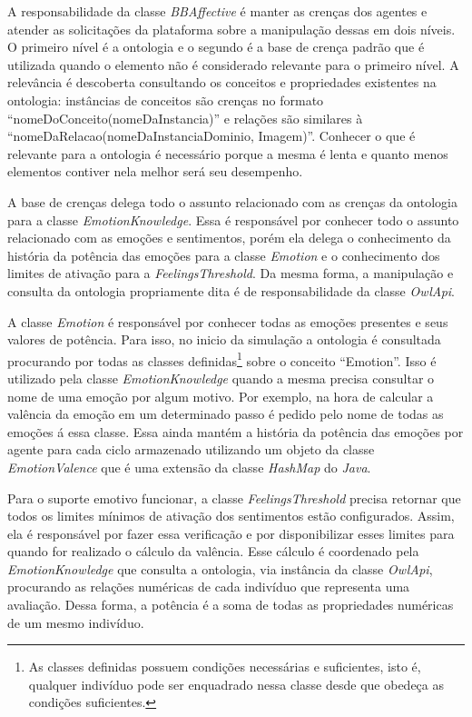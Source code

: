 A responsabilidade da classe \emph{BBAffective} é manter as crenças dos
agentes e atender as solicitações da plataforma \jason sobre a manipulação
dessas em dois níveis. O primeiro nível é a ontologia e o segundo é a base de
crença padrão que é utilizada quando o elemento não é considerado relevante
para o primeiro nível. A relevância é descoberta consultando os conceitos e
propriedades existentes na ontologia: instâncias de conceitos são
crenças no formato ``nomeDoConceito(nomeDaInstancia)'' e relações são
similares à ``nomeDaRelacao(nomeDaInstanciaDominio, Imagem)''. Conhecer o que
é relevante para a ontologia é necessário porque a mesma é lenta e quanto
menos elementos contiver nela melhor será seu desempenho.

A base de crenças delega todo o assunto relacionado com as crenças da
ontologia para a classe \emph{EmotionKnowledge}. Essa é responsável por
conhecer todo o assunto relacionado com as emoções e sentimentos, porém ela
delega o conhecimento da história da potência das emoções para a classe
\emph{Emotion} e o conhecimento dos limites de ativação para a
\emph{FeelingsThreshold}. Da mesma forma, a manipulação e consulta da
ontologia propriamente dita é de responsabilidade da classe \emph{OwlApi}.

A classe \emph{Emotion} é responsável por conhecer todas as emoções presentes
e seus valores de potência. Para isso, no inicio da simulação a ontologia é
consultada procurando por todas as classes definidas\footnote{As classes
definidas possuem condições necessárias e suficientes, isto é, qualquer
indivíduo pode ser enquadrado nessa classe desde que obedeça as condições
suficientes.} sobre o conceito ``Emotion''. Isso é utilizado pela classe
\emph{EmotionKnowledge} quando a mesma precisa consultar o nome de uma emoção
por algum motivo. Por exemplo, na hora de calcular a valência da emoção em um
determinado passo é pedido pelo nome de todas as emoções á essa classe. Essa
ainda mantém a história da potência das emoções por agente para cada ciclo
armazenado utilizando um objeto da classe \emph{EmotionValence} que é uma
extensão da classe \emph{HashMap} do \emph{Java}.

Para o suporte emotivo funcionar, a classe \emph{FeelingsThreshold} precisa
retornar que todos os limites mínimos de ativação dos sentimentos estão configurados.
Assim, ela é responsável por fazer essa verificação e por disponibilizar esses
limites para quando for realizado o cálculo da valência. Esse cálculo é
coordenado pela \emph{EmotionKnowledge} que consulta a ontologia, via instância
da classe \emph{OwlApi}, procurando as relações numéricas de cada indivíduo
que representa uma avaliação. Dessa forma, a potência é a soma de todas as
propriedades numéricas de um mesmo indivíduo.

